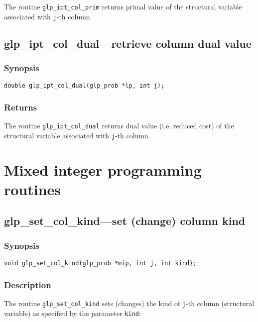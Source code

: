 The routine \verb|glp_ipt_col_prim| returns primal value of the
structural variable associated with \verb|j|-th column.

\subsection{glp\_ipt\_col\_dual---retrieve column dual value}

\subsubsection*{Synopsis}

\begin{verbatim}
double glp_ipt_col_dual(glp_prob *lp, int j);
\end{verbatim}

\subsubsection*{Returns}

The routine \verb|glp_ipt_col_dual| returns dual value (i.e. reduced
cost) of the structural variable associated with \verb|j|-th column.


\newpage

\section{Mixed integer programming routines}

\subsection{glp\_set\_col\_kind---set (change) column kind}

\subsubsection*{Synopsis}

\begin{verbatim}
void glp_set_col_kind(glp_prob *mip, int j, int kind);
\end{verbatim}

\subsubsection*{Description}

The routine \verb|glp_set_col_kind| sets (changes) the kind of
\verb|j|-th column (structural variable) as specified by the parameter
\verb|kind|:

